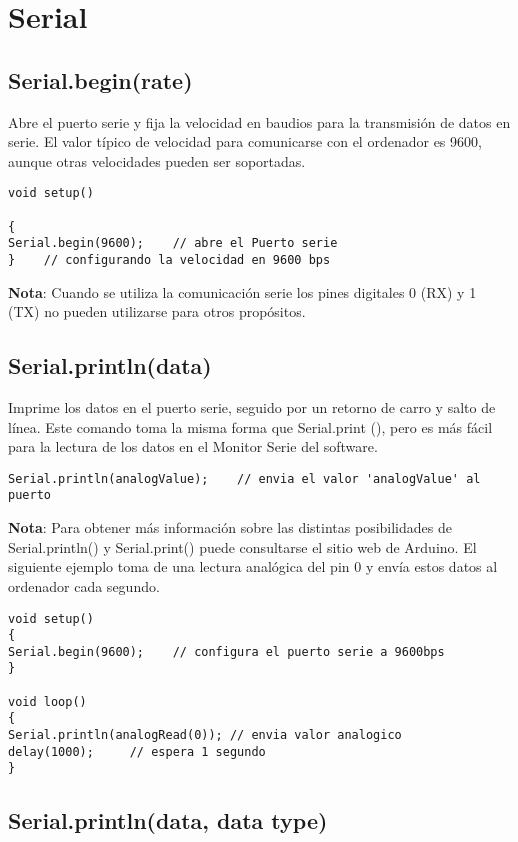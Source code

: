 \chapter{Serial}
\section{Serial.begin(rate)}

Abre el puerto serie y fija la velocidad en baudios para la transmisión de datos en serie. El valor típico de velocidad para comunicarse con el ordenador es 9600, aunque otras velocidades pueden ser soportadas.
\begin{lstlisting}
void setup()

{
Serial.begin(9600);    // abre el Puerto serie
}    // configurando la velocidad en 9600 bps
\end{lstlisting}
\textbf{Nota}: Cuando se utiliza la comunicación serie los pines digitales 0 (RX) y 1 (TX) no pueden utilizarse para otros propósitos.
\section{Serial.println(data)}

Imprime los datos en el puerto serie, seguido por un retorno de carro y salto de línea. Este comando toma la misma forma que Serial.print (), pero es más fácil para la lectura de los datos en el Monitor Serie del software.
\begin{lstlisting}
Serial.println(analogValue);    // envia el valor 'analogValue' al puerto
\end{lstlisting}
\textbf{Nota}: Para obtener más información sobre las distintas posibilidades de Serial.println() y Serial.print() puede consultarse el sitio web de Arduino.
\newpage{}
El siguiente ejemplo toma de una lectura analógica del pin 0 y envía estos datos al ordenador cada segundo.
\begin{lstlisting}
void setup()
{
Serial.begin(9600);    // configura el puerto serie a 9600bps
}

void loop()
{
Serial.println(analogRead(0)); // envia valor analogico
delay(1000);     // espera 1 segundo
}
\end{lstlisting}

\section{Serial.println(data, data type)}

